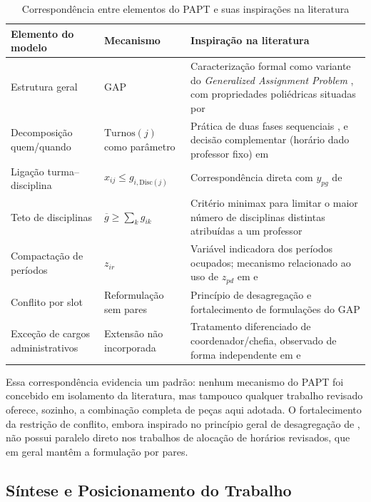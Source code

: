 \documentclass[11pt,a4paper]{article}
\begin{document}
\begin{table}[htbp]
\centering
\caption{Correspondência entre elementos do PAPT e suas inspirações na literatura}
\label{tab:correspondencia_literatura}
\begin{tabular}{p{3.6cm}p{2.6cm}p{6.5cm}}
\toprule
\textbf{Elemento do modelo} & \textbf{Mecanismo} & \textbf{Inspiração na literatura} \\
\midrule
Estrutura geral & GAP & Caracterização formal como variante do \textit{Generalized Assignment Problem} \cite{arenales2007pesquisa}, com propriedades poliédricas situadas por \cite{dantzig1963,martellototh1990} \\
Decomposição quem/quando & $\text{Turnos}(j)$ como parâmetro & Prática de duas fases sequenciais \cite{permanhane2014}, e decisão complementar (horário dado professor fixo) em \cite{modesto2025} \\
Ligação turma--disciplina & $x_{ij}\leq g_{i,\text{Disc}(j)}$ & Correspondência direta com $y_{pg}$ de \cite{permanhane2014} \\
Teto de disciplinas & $\overline{g}\geq\sum_k g_{ik}$ & Critério minimax para limitar o maior número de disciplinas distintas atribuídas a um professor \\
Compactação de períodos & $z_{ir}$ & Variável indicadora dos períodos ocupados; mecanismo relacionado ao uso de $z_{pd}$ em \cite{nogueira2018} e \cite{permanhane2014} \\
Conflito por slot & Reformulação sem pares & Princípio de desagregação e fortalecimento de formulações do GAP \cite{murthy2019} \\
Exceção de cargos administrativos & Extensão não incorporada & Tratamento diferenciado de coordenador/chefia, observado de forma independente em \cite{souzafilho2009} e \cite{permanhane2014} \\
\bottomrule
\end{tabular}
\end{table}

Essa correspondência evidencia um padrão: nenhum mecanismo do PAPT foi concebido em isolamento da literatura, mas tampouco qualquer trabalho revisado oferece, sozinho, a combinação completa de peças aqui adotada. O fortalecimento da restrição de conflito, embora
inspirado no princípio geral de desagregação de \cite{murthy2019}, não possui paralelo
direto nos trabalhos de alocação de horários revisados, que em geral mantêm a
formulação por pares.


\subsection{Síntese e Posicionamento do Trabalho}
 
\end{document}
